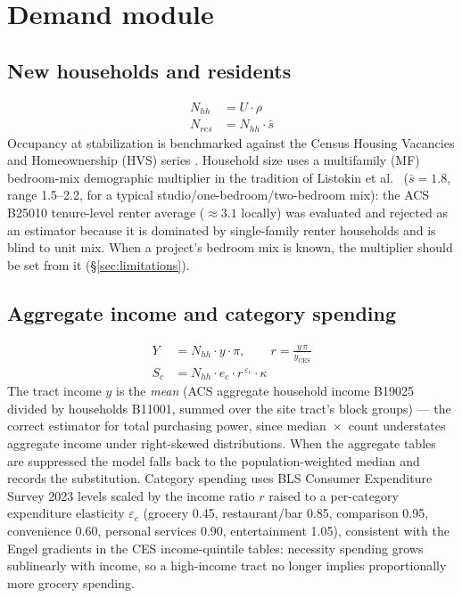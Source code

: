 \documentclass[11pt]{article}
\begin{document}
\section{Demand module}

\subsection{New households and residents}
\begin{align}
N_{hh}  &= U \cdot \rho \\
N_{res} &= N_{hh} \cdot \bar{s}
\end{align}
Occupancy at stabilization is benchmarked against the Census Housing Vacancies
and Homeownership (HVS) series \cite{hvs}. Household size uses a multifamily
(MF) bedroom-mix demographic multiplier in the tradition of Listokin et
al.~\cite{listokin2006} ($\bar{s} = 1.8$, range 1.5--2.2, for a typical
studio/one-bedroom/two-bedroom mix): the ACS B25010 tenure-level renter average
($\approx 3.1$ locally) was evaluated and rejected as an estimator because it
is dominated by single-family renter households and is blind to unit mix.
When a project's bedroom mix is known, the multiplier should be set from it
(\S\ref{sec:limitations}).

\subsection{Aggregate income and category spending}
\begin{align}
Y   &= N_{hh} \cdot y \cdot \pi, \qquad r = \frac{y\,\pi}{y_{\mathrm{CES}}} \\
S_c &= N_{hh} \cdot e_c \cdot r^{\,\varepsilon_c} \cdot \kappa
\label{eq:engel}
\end{align}
The tract income $y$ is the \emph{mean} (ACS aggregate household income
B19025 divided by households B11001, summed over the site tract's block
groups) --- the correct estimator for total purchasing power, since
median~$\times$~count understates aggregate income under right-skewed
distributions. When the aggregate tables are suppressed the model falls back
to the population-weighted median and records the substitution. Category
spending uses BLS Consumer Expenditure Survey 2023 levels \cite{blsces}
scaled by the income ratio $r$ raised to a per-category expenditure
elasticity $\varepsilon_c$ (grocery 0.45, restaurant/bar 0.85, comparison
0.95, convenience 0.60, personal services 0.90, entertainment 1.05),
consistent with the Engel gradients in the CES income-quintile tables:
necessity spending grows sublinearly with income, so a high-income tract no
longer implies proportionally more grocery spending.
\end{document}
